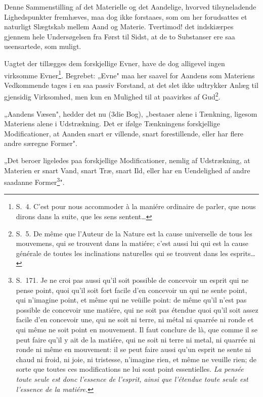 \documentclass[12pt,a4paper]{article}
\newcommand{\opage}[1]{\marginnote{\footnotesize\textit{[#1]}}}
\begin{document}
Denne Sammenstilling af det Materielle og det Aandelige, hvorved
tilsyneladende Lighedspunkter fremhæves, maa dog ikke forstaaes, som om her
forudsattes et naturligt Slægtskab mellem Aand og Materie. Tvertimod!
det indskiærpes gjennem hele Undersøgelsen fra Først til Sidst, at de to
Substanser ere saa ueensartede, som muligt.

Uagtet der tillægges dem forskjellige Evner, have de dog alligevel
ingen virksomme Evner\footnote{S.~4. C'est pour nous accommoder à la maniére
ordinaire de parler, que nous dirons dans la suite, que les sens sentent\dots}.
Begrebet: „Evne" maa her saavel for Aandens som Materiens Vedkommende tages
i en saa passiv Forstand, at det slet ikke udtrykker Anlæg til gjensidig
Virksomhed, men kun en Mulighed til at paavirkes af Gud\footnote{S.~5. De même
que l'Auteur de la Nature est la cause universelle de tous les mouvemens, qui se
trouvent dans la matiére; c'est aussi lui qui est la cause générale de toutes les
inclinations naturelles qui se trouvent dans les esprits\dots}.

„Aandens Væsen", hedder det nu (3die Bog), „bestaaer alene i
Tænkning, ligesom Materiens alene i Udstrækning. Det er ifølge Tænkningens
\opage{11} forskjellige Modificationer, at Aanden snart er villende, snart forestillende,
eller har flere andre særegne Former".

„Det beroer ligeledes paa forskjellige Modificationer, nemlig af
Udstrækning, at Materien er snart Vand, snart Træ, snart Ild, eller har en
Uendelighed af andre saadanne Former\footnote{S.~171. Je ne croi pas aussi
qu'il soit possible de concevoir un esprit qui ne pense point, quoi qu'il soit
fort facile d'en concevoir un qui ne sente point, qui n'imagine point, et même
qui ne veüille point: de même qu'il n'est pas possible de concevoir une matiére,
qui ne soit pas étendue quoi qu'il soit assez facile d'en concevoir une, qui ne
soit ni terre, ni métal ni quarrée ni ronde et qui même ne soit point en
mouvement. Il faut conclure de là, que comme il se peut faire qu'il y ait de la
matiére, qui ne soit ni terre ni metal, ni quarrée ni ronde ni même en
mouvement: il se peut faire aussi qu'un esprit ne sente ni chaud ni froid, ni
joie, ni tristesse, n'imagine rien, et même ne veuille rien; de sorte que toutes
ces modifications ne lui sont point essentielles. \emph{La pensée toute seule
est donc l'essence de l'esprit, ainsi que l'étendue toute seule est l'essence de
la matiére.}}".
\end{document}
